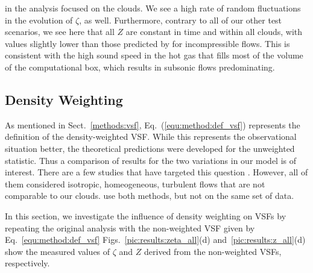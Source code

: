     in the analysis focused on the clouds.
We see a high rate of random fluctuations in the evolution of $\zeta$, as well.
Furthermore, contrary to all of our other test scenarios, we see here that all $Z$ are constant in time and within all clouds, with values slightly lower than those predicted by \citet{She1994} for 
    incompressible
flows.  
     This is consistent with the high sound speed in the hot gas that fills most of the volume of  
     the computational box, which results in subsonic flows predominating.


\subsection{Density Weighting}\label{results:densweight}

As mentioned in Sect.~\ref{methods:vsf}, Eq.~(\ref{equ:method:def_vsf}) represents the definition of the density-weighted VSF.
    While this represents the observational situation better, the theoretical predictions 
    were developed for the unweighted statistic.  Thus a comparison of results for the 
    two variations in our model is of interest. 
There are a few studies that have targeted this question 
\citep[e.g.,][]{Benzi1993,Schmidt2008, Benzi2010,Gotoh2002}.  
However, all of them considered 
    isotropic, homeogeneous, turbulent flows
that are not comparable to our clouds.
\citet{Padoan2016a} use both methods, but not on the same set of data. 

In this section, we investigate the influence of density weighting on VSFs by repeating the original analysis with the non-weighted VSF given by
    Eq.~\ref{equ:method:def_vsf}
Figs.~\ref{pic:results:zeta_all}(d) and~\ref{pic:results:z_all}(d) show the measured values of $\zeta$ and $Z$ derived from the non-weighted VSFs, respectively.

